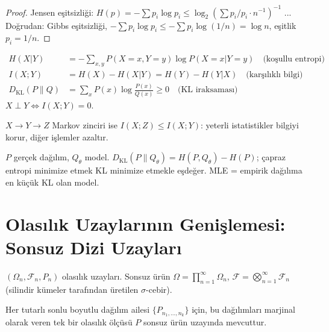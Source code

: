 \begin{proof}
Jensen eşitsizliği: $H(p)=-\sum p_i\log p_i\leq\log_2(\sum p_i/p_i \cdot n^{-1})^{-1}$ ... Doğrudan: Gibbs eşitsizliği, $-\sum p_i\log p_i\leq-\sum p_i\log(1/n)=\log n$, eşitlik $p_i=1/n$.
\end{proof}

\begin{tanim}\label{def:karsılikli_bilgi}
\begin{align*}
  H(X|Y) &= -\sum_{x,y}P(X=x,Y=y)\log P(X=x|Y=y) \quad \text{(koşullu entropi)}\\
  I(X;Y) &= H(X)-H(X|Y) = H(Y)-H(Y|X) \quad \text{(karşılıklı bilgi)}\\
  D_{\mathrm{KL}}(P\|Q) &= \sum_x P(x)\log\frac{P(x)}{Q(x)} \geq 0 \quad \text{(KL iraksaması)}
\end{align*}
$X\perp Y\iff I(X;Y)=0$.
\end{tanim}

\begin{teorem}\label{thm:veri_isleme}
$X\to Y\to Z$ Markov zinciri ise $I(X;Z)\leq I(X;Y)$: yeterli istatistikler bilgiyi korur, diğer işlemler azaltır.
\end{teorem}

\begin{ornek}\label{ex:kl_olasilik}
$P$ gerçek dağılım, $Q_\theta$ model. $D_{\mathrm{KL}}(P\|Q_\theta)=H(P,Q_\theta)-H(P)$; çapraz entropi minimize etmek KL minimize etmekle eşdeğer. MLE = empirik dağılıma en küçük KL olan model.
\end{ornek}

\section{Olasılık Uzaylarının Genişlemesi: Sonsuz Dizi Uzayları}
\label{sec:sonsuz_uzay}

\begin{tanim}\label{def:urun_uzayi}
$(\Omega_n,\mathcal{F}_n,P_n)$ olasılık uzayları. Sonsuz ürün $\Omega=\prod_{n=1}^\infty\Omega_n$, $\mathcal{F}=\bigotimes_{n=1}^\infty\mathcal{F}_n$ (silindir kümeler tarafından üretilen $\sigma$-cebir).
\end{tanim}

\begin{teorem}\label{thm:kolmogorov_genisleme}
Her tutarlı sonlu boyutlu dağılım ailesi $\{P_{n_1,\ldots,n_k}\}$ için, bu dağılımları marjinal olarak veren tek bir olasılık ölçüsü $P$ sonsuz ürün uzayında mevcuttur.
\end{teorem}

